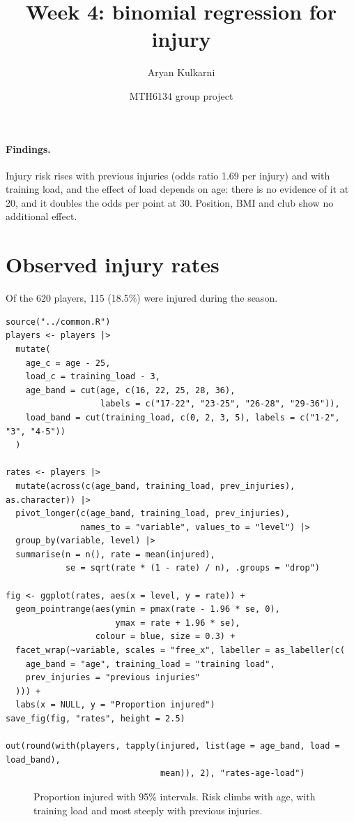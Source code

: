 \documentclass[12pt,notitlepage]{report}
\title{Week 4: binomial regression for injury}
\author{Aryan Kulkarni}
\date{MTH6134 group project}
\begin{document}
\maketitle

\paragraph{Findings.}
Injury risk rises with previous injuries (odds ratio 1.69 per injury) and
with training load, and the effect of load depends on age: there is no evidence of it at
20, and it doubles the odds per point at 30. Position, BMI and club show no
additional effect.

\section{Observed injury rates}

Of the 620 players, 115 (18.5\%) were injured during the season.

\begin{verbatim}
source("../common.R")
players <- players |>
  mutate(
    age_c = age - 25,
    load_c = training_load - 3,
    age_band = cut(age, c(16, 22, 25, 28, 36),
                   labels = c("17-22", "23-25", "26-28", "29-36")),
    load_band = cut(training_load, c(0, 2, 3, 5), labels = c("1-2", "3", "4-5"))
  )

rates <- players |>
  mutate(across(c(age_band, training_load, prev_injuries), as.character)) |>
  pivot_longer(c(age_band, training_load, prev_injuries),
               names_to = "variable", values_to = "level") |>
  group_by(variable, level) |>
  summarise(n = n(), rate = mean(injured),
            se = sqrt(rate * (1 - rate) / n), .groups = "drop")

fig <- ggplot(rates, aes(x = level, y = rate)) +
  geom_pointrange(aes(ymin = pmax(rate - 1.96 * se, 0),
                      ymax = rate + 1.96 * se),
                  colour = blue, size = 0.3) +
  facet_wrap(~variable, scales = "free_x", labeller = as_labeller(c(
    age_band = "age", training_load = "training load",
    prev_injuries = "previous injuries"
  ))) +
  labs(x = NULL, y = "Proportion injured")
save_fig(fig, "rates", height = 2.5)

out(round(with(players, tapply(injured, list(age = age_band, load = load_band),
                               mean)), 2), "rates-age-load")
\end{verbatim}

\begin{figure}[H]
  \centering
  \caption{Proportion injured with 95\% intervals. Risk climbs with age,
    with training load and most steeply with previous injuries.}
\end{figure}
\end{document}
